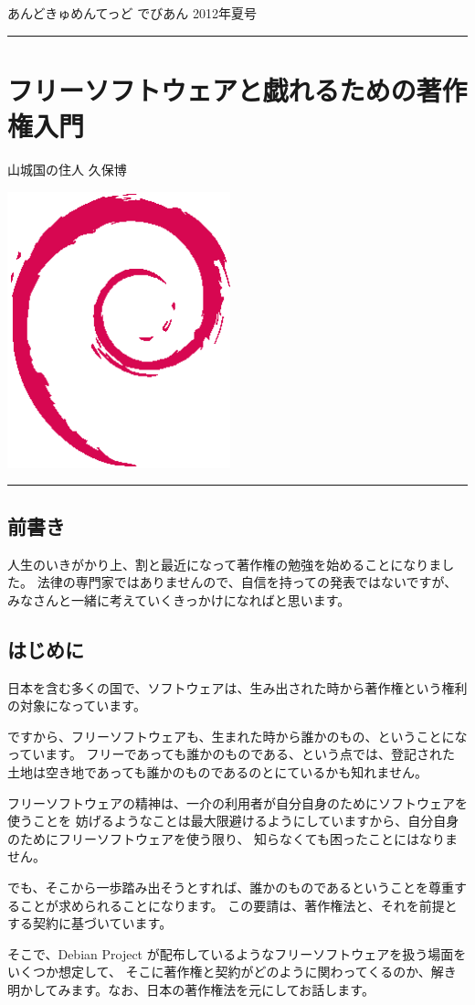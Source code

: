 \documentclass[mingoth,a4paper]{jsarticle}
\renewcommand{\dancersection}[2]{%
\newpage
あんどきゅめんてっど でびあん 2012年夏号
%
\vspace{0.1mm}\\
{\color{dancerdarkblue}\rule{\hsize}{2mm}}

%
%
\begin{minipage}[t]{0.6\hsize}
\color{dancerdarkblue}
\vspace{1cm}
\section{#1}
\hfill{}#2\\
\end{minipage}
\begin{minipage}[t]{0.4\hsize}
\vspace{-2cm}
\hfill{}\includegraphics[height=8cm]{image200502/openlogo-nd.eps}\\
\vspace{-5cm}
\end{minipage}
%
{\color{dancerlightblue}\rule{0.66\hsize}{2mm}}
%
\vspace{2cm}
}
\begin{document}

\dancersection{フリーソフトウェアと戯れるための著作権入門}{山城国の住人 久保博}

\subsection{前書き}

人生のいきがかり上、割と最近になって著作権の勉強を始めることになりました。
法律の専門家ではありませんので、自信を持っての発表ではないですが、
みなさんと一緒に考えていくきっかけになればと思います。

\subsection{はじめに}

日本を含む多くの国で、ソフトウェアは、生み出された時から著作権という権利の対象になっています。

ですから、フリーソフトウェアも、生まれた時から誰かのもの、ということになっています。
フリーであっても誰かのものである、という点では、登記された土地は空き地であっても誰かのものであるのとにているかも知れません。

フリーソフトウェアの精神は、一介の利用者が自分自身のためにソフトウェアを使うことを
妨げるようなことは最大限避けるようにしていますから、自分自身のためにフリーソフトウェアを使う限り、
知らなくても困ったことにはなりません。

でも、そこから一歩踏み出そうとすれば、誰かのものであるということを尊重することが求められることになります。
この要請は、著作権法と、それを前提とする契約に基づいています。

そこで、Debian Project が配布しているようなフリーソフトウェアを扱う場面をいくつか想定して、
そこに著作権と契約がどのように関わってくるのか、解き明かしてみます。なお、日本の著作権法を元にしてお話します。
\end{document}
